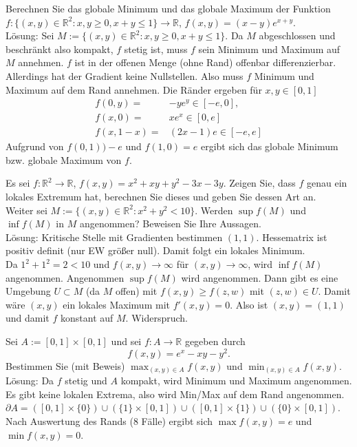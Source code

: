 Berechnen Sie das globale Minimum und das globale Maximum der Funktion $f : \{(x,y) \in \mathbb{R}^2 : x,y \geq 0, x + y \leq 1\} \to \mathbb{R}$, $f(x,y) = (x-y)e^{x+y}$.\\
Lösung:
Sei $M := \{(x,y) \in \mathbb{R}^2 : x,y \geq 0, x + y \leq 1\}$.
Da $M$ abgeschlossen und beschränkt also kompakt, $f$ stetig ist, muss $f$ sein Minimum und Maximum auf $M$ annehmen.
$f$ ist in der offenen Menge (ohne Rand) offenbar differenzierbar.
Allerdings hat der Gradient keine Nullstellen.
Also muss $f$ Minimum und Maximum auf dem Rand annehmen.
Die Ränder ergeben für $x,y \in [0,1]$
\begin{align*}
  f(0,y) =& -ye^y \in [-e,0],\\
  f(x,0) =& xe^x \in [0,e]\\
  f(x,1-x) =& (2x - 1)e \in [-e,e]
\end{align*}
Aufgrund von $f(0,1) ) -e$ und $f(1,0) = e$ ergibt sich das globale Minimum bzw. globale Maximum von $f$.

Es sei $f : \mathbb{R}^2 \to \mathbb{R}$, $f(x,y) = x^2 + xy + y^2 -3x -3y$.
Zeigen Sie, dass $f$ genau ein lokales Extremum hat, berechnen Sie dieses und geben Sie dessen Art an.\\
Weiter sei $M := \{(x,y) \in \mathbb{R}^2 : x^2 + y^2 < 10\}$.
Werden $\sup f(M)$ und $\inf f(M)$ in $M$ angenommen?
Beweisen Sie Ihre Aussagen.\\
Lösung:
Kritische Stelle mit Gradienten bestimmen $(1,1)$.
Hessematrix ist positiv definit (nur EW größer null).
Damit folgt ein lokales Minimum.\\
Da $1^2 + 1^2 = 2 < 10$ und $f(x,y) \to \infty$ für $(x,y) \to \infty$, wird $\inf f(M)$ angenommen.
Angenommen $\sup f(M)$ wird angenommen.
Dann gibt es eine Umgebung $U \subset M$ (da $M$ offen) mit $f(x,y) \geq f(z,w)$ mit $(z,w) \in U$.
Damit wäre $(x,y)$ ein lokales Maximum mit $f'(x,y) = 0$.
Also ist $(x,y) = (1,1)$ und damit $f$ konstant auf $M$.
Widerspruch.

Sei $A := [0,1] \times [0,1]$ und sei $f : A \to \mathbb{R}$ gegeben durch
\begin{displaymath}
  f(x,y) = e^x - xy - y^2.
\end{displaymath}
Bestimmen Sie (mit Beweis) $\max_{(x,y) \in A} f(x,y)$ und $\min_{(x,y) \in A} f(x,y)$.\\
Lösung:
Da $f$ stetig und $A$ kompakt, wird Minimum und Maximum angenommen.
Es gibt keine lokalen Extrema, also wird Min/Max auf dem Rand angenommen.
$\partial A = ([0,1] \times \{0\}) \cup (\{1\} \times [0,1]) \cup ([0,1] \times \{1\}) \cup (\{0\} \times [0,1])$.
Nach Auswertung des Rands (8 Fälle) ergibt sich $\max f(x,y) = e$ und $\min f(x,y) = 0$.

